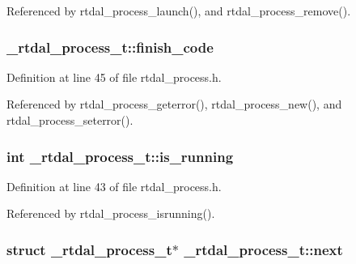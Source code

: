 Referenced by rtdal\-\_\-process\-\_\-launch(), and rtdal\-\_\-process\-\_\-remove().

\hypertarget{struct__rtdal__process__t_a236ea6c8665b6072ae6b32342bded647}{
\subsubsection[{finish\-\_\-code}]{ \-\_\-rtdal\-\_\-process\-\_\-t\-::finish\-\_\-code}}\label{struct__rtdal__process__t_a236ea6c8665b6072ae6b32342bded647}


Definition at line 45 of file rtdal\-\_\-process.\-h.



Referenced by rtdal\-\_\-process\-\_\-geterror(), rtdal\-\_\-process\-\_\-new(), and rtdal\-\_\-process\-\_\-seterror().

\hypertarget{struct__rtdal__process__t_a352c3d3dbdc8bec9b6177ab1fd0dddc2}{
\subsubsection[{is\-\_\-running}]{\setlength{\rightskip}{0pt plus 5cm}int \-\_\-rtdal\-\_\-process\-\_\-t\-::is\-\_\-running}}\label{struct__rtdal__process__t_a352c3d3dbdc8bec9b6177ab1fd0dddc2}


Definition at line 43 of file rtdal\-\_\-process.\-h.



Referenced by rtdal\-\_\-process\-\_\-isrunning().

\hypertarget{struct__rtdal__process__t_a623279364fe34c5d8743b2e73124a070}{
\subsubsection[{next}]{\setlength{\rightskip}{0pt plus 5cm}struct {\bf \-\_\-rtdal\-\_\-process\-\_\-t}$\ast$ \-\_\-rtdal\-\_\-process\-\_\-t\-::next}}\label{struct__rtdal__process__t_a623279364fe34c5d8743b2e73124a070}


